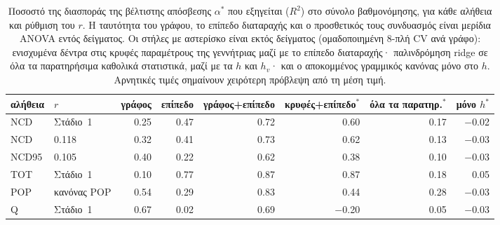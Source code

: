 \begin{table}[t]
\centering
\footnotesize
\caption{Ποσοστό της διασποράς της βέλτιστης απόσβεσης $\alpha^*$ που εξηγείται ($R^2$) στο σύνολο βαθμονόμησης, για κάθε αλήθεια και ρύθμιση του $r$. Η ταυτότητα του γράφου, το επίπεδο διαταραχής και ο προσθετικός τους συνδυασμός είναι μερίδια ANOVA εντός δείγματος. Οι στήλες με αστερίσκο είναι εκτός δείγματος (ομαδοποιημένη 8-πλή CV ανά γράφο): ενισχυμένα δέντρα στις κρυφές παραμέτρους της γεννήτριας μαζί με το επίπεδο διαταραχής· παλινδρόμηση ridge σε όλα τα παρατηρήσιμα καθολικά στατιστικά, μαζί με τα $h$ και $h_v$· και ο αποκομμένος γραμμικός κανόνας μόνο στο $h$. Αρνητικές τιμές σημαίνουν χειρότερη πρόβλεψη από τη μέση τιμή.}
\label{tab:stage2dec}
\begin{tabular}{@{}llrrrrrr@{}}
\toprule
αλήθεια & $r$ & γράφος & επίπεδο & γράφος+επίπεδο & κρυφές+επίπεδο$^{*}$ & όλα τα παρατηρ.$^{*}$ & μόνο $h$$^{*}$ \\
\midrule
NCD & Στάδιο~1 & 0.25 & 0.47 & 0.72 & 0.60 & 0.17 & $-$0.02 \\
NCD & 0.118 & 0.32 & 0.41 & 0.73 & 0.62 & 0.13 & $-$0.03 \\
NCD95 & 0.105 & 0.40 & 0.22 & 0.62 & 0.38 & 0.10 & $-$0.03 \\
TOT & Στάδιο~1 & 0.10 & 0.77 & 0.87 & 0.87 & 0.18 & 0.05 \\
POP & κανόνας POP & 0.54 & 0.29 & 0.83 & 0.44 & 0.28 & $-$0.03 \\
Q & Στάδιο~1 & 0.67 & 0.02 & 0.69 & $-$0.20 & 0.05 & $-$0.03 \\
\bottomrule
\end{tabular}
\end{table}
